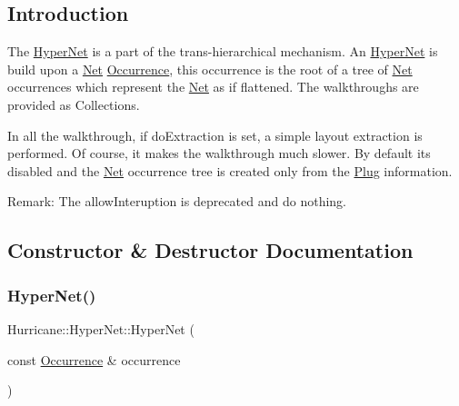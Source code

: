 \hypertarget{classHurricane_1_1HyperNet_secHyperNetIntro}{}\subsection{Introduction}\label{classHurricane_1_1HyperNet_secHyperNetIntro}
The \mbox{\hyperlink{classHurricane_1_1HyperNet}{Hyper\+Net}} is a part of the trans-\/hierarchical mechanism. An \mbox{\hyperlink{classHurricane_1_1HyperNet}{Hyper\+Net}} is build upon a \mbox{\hyperlink{classHurricane_1_1Net}{Net}} \mbox{\hyperlink{classHurricane_1_1Occurrence}{Occurrence}}, this occurrence is the root of a tree of \mbox{\hyperlink{classHurricane_1_1Net}{Net}} occurrences which represent the \mbox{\hyperlink{classHurricane_1_1Net}{Net}} as if flattened. The walkthroughs are provided as Collections.

In all the walkthrough, if {\ttfamily do\+Extraction} is set, a simple layout extraction is performed. Of course, it makes the walkthrough much slower. By default it\textquotesingle{}s disabled and the \mbox{\hyperlink{classHurricane_1_1Net}{Net}} occurrence tree is created only from the \mbox{\hyperlink{classHurricane_1_1Plug}{Plug}} information.

\begin{DoxyParagraph}{Remark\+: The {\ttfamily allow\+Interuption} is deprecated and do nothing.}

\end{DoxyParagraph}


\subsection{Constructor \& Destructor Documentation}
\mbox{\label{classHurricane_1_1HyperNet_a30bdc04b4dece8bdef66361fe4469175}} 
\subsubsection{\texorpdfstring{Hyper\+Net()}{HyperNet()}}
{\footnotesize\ttfamily Hurricane\+::\+Hyper\+Net\+::\+Hyper\+Net (\begin{DoxyParamCaption}\item[{const \mbox{\hyperlink{classHurricane_1_1Occurrence}{Occurrence}} \&}]{occurrence }\end{DoxyParamCaption})}

